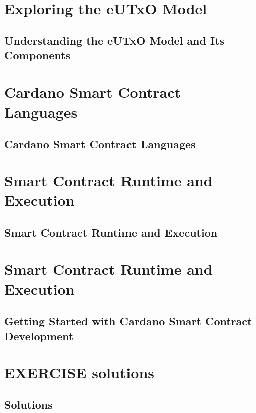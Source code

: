 \part{Exploring the eUTxO Model}
\newpage
\chapter{Understanding the eUTxO Model and Its Components} \label{ch:exploring}



\part{Cardano Smart Contract Languages}
\newpage
\chapter{Cardano Smart Contract Languages} \label{ch:Languages}


\part{Smart Contract Runtime and Execution}
\newpage
\chapter{Smart Contract Runtime and Execution} \label{ch:Runtime}


\part{Smart Contract Runtime and Execution}
\newpage
\chapter{Getting Started with Cardano Smart Contract Development} \label{ch:Getting started}




\newpage
\part{EXERCISE solutions}
\chapter{Solutions}




\printglossary[title={Glossary}, type=main]



